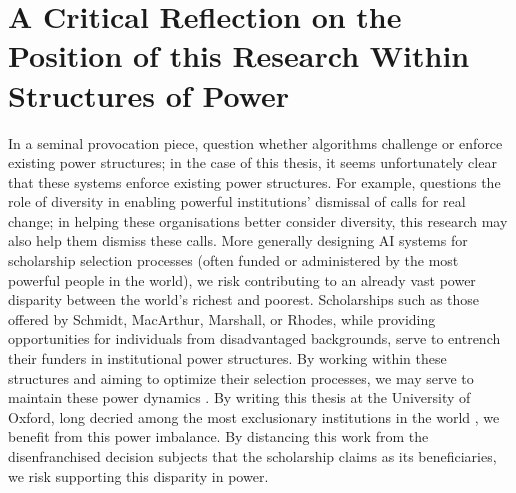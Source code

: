 \section{A Critical Reflection on the Position of this Research Within Structures of Power}\label{sec:reflexivity}
In a seminal provocation piece, \textcite{Barocas_Hood_Ziewitz_2013} question whether algorithms challenge or enforce existing power structures; in the case of this thesis, it seems unfortunately clear that these systems enforce existing power structures. For example, \textcite{Ahmed_2012} questions the role of diversity in enabling powerful institutions' dismissal of calls for real change; in helping these organisations better consider diversity, this research may also help them dismiss these calls. More generally designing AI systems for scholarship selection processes (often funded or administered by the most powerful people in the world), we risk contributing to an already vast power disparity between the world's richest and poorest. Scholarships such as those offered by Schmidt, MacArthur, Marshall, or Rhodes, while providing opportunities for individuals from disadvantaged backgrounds, serve to entrench their funders in institutional power structures. By working within these structures and aiming to optimize their selection processes, we may serve to maintain these power dynamics \cite{Ziegler_2008}. By writing this thesis at the University of Oxford, long decried among the most exclusionary institutions in the world \cite{Ziegler_2008}, we benefit from this power imbalance. By distancing this work from the disenfranchised decision subjects that the scholarship claims as its beneficiaries, we risk supporting this disparity in power. 


